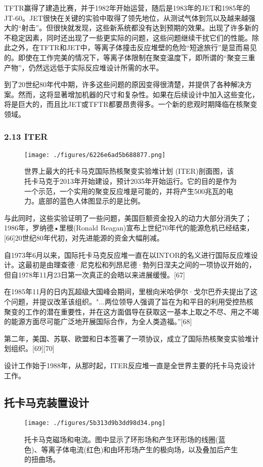 TFTR赢得了建造比赛，并于1982年开始运营，随后是1983年的JET和1985年的JT-60。JET很快在关键的实验中取得了领先地位，从测试气体到氘以及越来越强大的“射击”。但很快就发现，这些新系统都没有达到预期的效果。出现了许多新的不稳定因素，同时还出现了一些更实际的问题，这些问题继续干扰它们的性能。除此之外，在TFTR和JET中，等离子体撞击反应堆壁的危险“短途旅行”是显而易见的。即使在工作完美的情况下，等离子体限制在聚变温度下，即所谓的“聚变三重产物”，仍然远远低于实际反应堆设计所需的水平。

到了20世纪80年代中期，许多这些问题的原因变得很清楚，并提供了各种解决方案。然而，这将显著增加机器的尺寸和复杂性。如果在后续设计中加入这些变化，将是巨大的，而且比JET或TFTR都要昂贵得多。一个新的悲观时期降临在核聚变领域。
\subsubsection{2.13 ITER}
\begin{figure}[ht]
\centering
\texttt{[image: ./figures/6226e6ad5b688877.png]}
\caption{世界上最大的托卡马克国际热核聚变实验堆计划 (ITER)剖面图，该托卡马克于2013年开始建设，预计2035年开始运行。它的目的是作为一个示范，一个实用的聚变反应堆是可能的，并将产生500兆瓦的电力。底部的蓝色人体图显示的是比例。} \label{fig_TKMK_4}
\end{figure}
与此同时，这些实验证明了一些问题，美国巨额资金投入的动力大部分消失了；1986年，罗纳德•里根(Ronald Reagan)宣布上世纪70年代的能源危机已经结束，[66]20世纪80年代初，对先进能源的资金大幅削减。

自1973年6月以来，国际托卡马克反应堆一直在以INTOR的名义进行国际反应堆设计。这最初是由理查德·尼克松和列昂尼德·勃列日涅夫之间的一项协议开始的，但自1978年11月23日第一次真正的会晤以来进展缓慢。[67]

在1985年11月的日内瓦超级大国峰会期间，里根向米哈伊尔·戈尔巴乔夫提出了这个问题，并提议改革该组织。"...两位领导人强调了旨在为和平目的利用受控热核聚变的工作的潜在重要性，并在这方面倡导在获取这一基本上取之不尽、用之不竭的能源方面尽可能广泛地开展国际合作，为全人类造福。”[68]

第二年，美国、苏联、欧盟和日本签署了一项协议，成立了国际热核聚变实验堆计划组织。[69][70]

设计工作始于1988年，从那时起，ITER反应堆一直是全世界主要的托卡马克设计工作。

\subsection{托卡马克装置设计}
\begin{figure}[ht]
\centering
\texttt{[image: ./figures/5b313d9b3dd98d34.png]}
\caption{托卡马克磁场和电流。图中显示了环形场和产生环形场的线圈(蓝色)、等离子体电流(红色)和由环形场产生的极向场，以及叠加后产生的扭曲场。} \label{fig_TKMK_5}
\end{figure}

